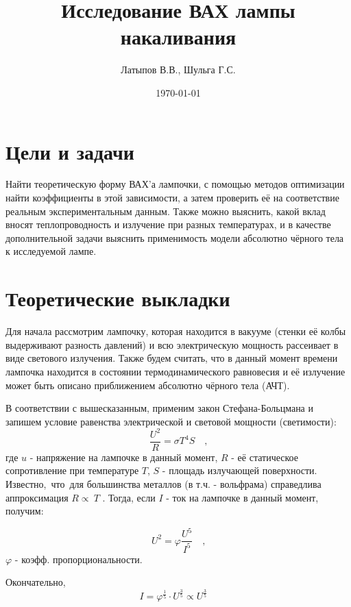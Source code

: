 \documentclass[12pt]{article}
\title{Исследование ВАХ лампы накаливания}
\author{Латыпов В.В., Шульга Г.С.}
\date{\today}
\begin{document}
    \maketitle


    \section{Цели и задачи}

    Найти теоретическую форму ВАХ'а лампочки, с помощью методов оптимизации найти коэффициенты в этой зависимости, а затем проверить её на соответствие реальным экспериментальным данным.
    Также можно выяснить, какой вклад вносят теплопроводность и излучение при разных температурах, и в качестве дополнительной задачи выяснить применимость модели абсолютно чёрного тела к исследуемой лампе.

    \section{Теоретические выкладки}
    Для начала рассмотрим лампочку, которая находится в вакууме (стенки её колбы выдерживают разность давлений) и всю электрическую мощность рассеивает в виде светового излучения. Также будем считать, что в данный момент времени лампочка находится в состоянии термодинамического равновесия и её излучение может быть описано приближением абсолютно чёрного тела (АЧТ).

    В соответствии с вышесказанным, применим закон Стефана-Больцмана и запишем условие равенства электрической и световой мощности (светимости):
    \begin{equation}
        \label{1}
        \frac{U^2}{R} = \sigma T^4 S \quad
        \text{,}
    \end{equation}
    где $u$ - напряжение на лампочке в данный момент, $R$ - её статическое сопротивление при температуре $T$,  $S$ - площадь излучающей поверхности.
    Известно,~что~для большинства металлов (в т.ч. - вольфрама) справедлива аппроксимация $ R \propto~ T $ .
    Тогда, если $I$ - ток на лампочке в данный момент, получим:

    \begin{equation}
        \label{2}
        U^2 = \varphi \frac{U^5}{I^5} \quad
        \text{,}
    \end{equation}
    $\varphi$ - коэфф. пропорциональности.

    Окончательно,
    \begin{equation}
        \label{2}
        I = \varphi ^ \frac15  \cdot U ^ \frac35 \propto U ^ \frac35 \quad
    \end{equation}
\end{document}
